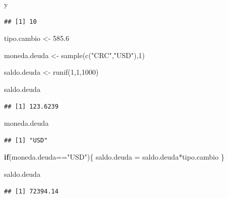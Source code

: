 \documentclass[
  12pt,
]{book}
\newenvironment{Shaded}{\begin{snugshade}}{\end{snugshade}}
\newcommand{\ControlFlowTok}[1]{\textcolor[rgb]{0.13,0.29,0.53}{\textbf{#1}}}
\newcommand{\DecValTok}[1]{\textcolor[rgb]{0.00,0.00,0.81}{#1}}
\newcommand{\FloatTok}[1]{\textcolor[rgb]{0.00,0.00,0.81}{#1}}
\newcommand{\FunctionTok}[1]{\textcolor[rgb]{0.00,0.00,0.00}{#1}}
\newcommand{\NormalTok}[1]{#1}
\newcommand{\OtherTok}[1]{\textcolor[rgb]{0.56,0.35,0.01}{#1}}
\newcommand{\SpecialCharTok}[1]{\textcolor[rgb]{0.00,0.00,0.00}{#1}}
\newcommand{\StringTok}[1]{\textcolor[rgb]{0.31,0.60,0.02}{#1}}
\begin{document}
\begin{Shaded}
\begin{Highlighting}[]
\NormalTok{y}
\end{Highlighting}
\end{Shaded}

\begin{verbatim}
## [1] 10
\end{verbatim}

\begin{Shaded}
\begin{Highlighting}[]
\NormalTok{tipo.cambio }\OtherTok{\textless{}{-}} \FloatTok{585.6}

\NormalTok{moneda.deuda }\OtherTok{\textless{}{-}} \FunctionTok{sample}\NormalTok{(}\FunctionTok{c}\NormalTok{(}\StringTok{"CRC"}\NormalTok{,}\StringTok{"USD"}\NormalTok{),}\DecValTok{1}\NormalTok{)}

\NormalTok{saldo.deuda }\OtherTok{\textless{}{-}} \FunctionTok{runif}\NormalTok{(}\DecValTok{1}\NormalTok{,}\DecValTok{1}\NormalTok{,}\DecValTok{1000}\NormalTok{)}

\NormalTok{saldo.deuda}
\end{Highlighting}
\end{Shaded}

\begin{verbatim}
## [1] 123.6239
\end{verbatim}

\begin{Shaded}
\begin{Highlighting}[]
\NormalTok{moneda.deuda}
\end{Highlighting}
\end{Shaded}

\begin{verbatim}
## [1] "USD"
\end{verbatim}

\begin{Shaded}
\begin{Highlighting}[]
\ControlFlowTok{if}\NormalTok{(moneda.deuda}\SpecialCharTok{==}\StringTok{"USD"}\NormalTok{)\{}
\NormalTok{  saldo.deuda }\OtherTok{=}\NormalTok{ saldo.deuda}\SpecialCharTok{*}\NormalTok{tipo.cambio}
\NormalTok{\}}


\NormalTok{saldo.deuda}
\end{Highlighting}
\end{Shaded}

\begin{verbatim}
## [1] 72394.14
\end{verbatim}
\end{document}
